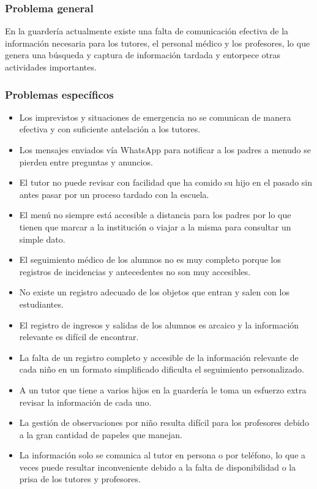 \documentclass{article}
\begin{document}
\subsubsection{Problema general}

En la guardería actualmente existe una falta de comunicación efectiva de la información necesaria para los tutores, el personal médico y los profesores, lo que genera una búsqueda y captura de información tardada y entorpece otras actividades importantes.

\subsubsection{Problemas específicos}
\begin{itemize}
	\item Los imprevistos y situaciones de emergencia no se comunican de manera efectiva y con suficiente antelación a los tutores.
	\item Los mensajes enviados vía WhatsApp para notificar a los padres a menudo se pierden entre preguntas y anuncios.
	\item El tutor no puede revisar con facilidad que ha comido su hijo en el pasado sin antes pasar por un proceso tardado con la escuela.
	\item El menú no siempre está accesible a distancia para los padres por lo que tienen que marcar a la institución o viajar a la misma para consultar un simple dato.
	\item El seguimiento médico de los alumnos no es muy completo porque los registros de  incidencias y antecedentes no son muy accesibles.
	\item No existe un registro adecuado de los objetos que entran y salen con los estudiantes.
	\item El registro de ingresos y salidas de los alumnos es arcaico y la información relevante es difícil de encontrar.
	\item La falta de un registro completo y accesible de la información relevante de cada niño en un formato simplificado dificulta el seguimiento personalizado.
	\item A un tutor que tiene a varios hijos en la guardería le toma un esfuerzo extra revisar la información de cada uno.
	\item La gestión de observaciones por niño resulta difícil para los profesores debido a la gran cantidad de papeles que manejan.
	\item La información solo se comunica al tutor en persona o por teléfono, lo que a veces puede resultar inconveniente debido a la falta de disponibilidad o la prisa de los tutores y profesores.

\end{itemize}
\end{document}
